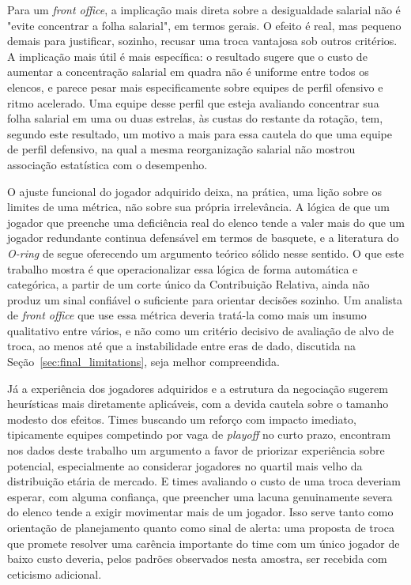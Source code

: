 Para um \textit{front office}, a implicação mais direta sobre a desigualdade salarial não é "evite concentrar a folha salarial", em termos gerais. O efeito é real, mas pequeno demais para justificar, sozinho, recusar uma troca vantajosa sob outros critérios. A implicação mais útil é mais específica: o resultado sugere que o custo de aumentar a concentração salarial em quadra não é uniforme entre todos os elencos, e parece pesar mais especificamente sobre equipes de perfil ofensivo e ritmo acelerado. Uma equipe desse perfil que esteja avaliando concentrar sua folha salarial em uma ou duas estrelas, às custas do restante da rotação, tem, segundo este resultado, um motivo a mais para essa cautela do que uma equipe de perfil defensivo, na qual a mesma reorganização salarial não mostrou associação estatística com o desempenho.

O ajuste funcional do jogador adquirido deixa, na prática, uma lição sobre os limites de uma métrica, não sobre sua própria irrelevância. A lógica de que um jogador que preenche uma deficiência real do elenco tende a valer mais do que um jogador redundante continua defensável em termos de basquete, e a literatura do \textit{O-ring} de \citet{kremer1993} segue oferecendo um argumento teórico sólido nesse sentido. O que este trabalho mostra é que operacionalizar essa lógica de forma automática e categórica, a partir de um corte único da Contribuição Relativa, ainda não produz um sinal confiável o suficiente para orientar decisões sozinho. Um analista de \textit{front office} que use essa métrica deveria tratá-la como mais um insumo qualitativo entre vários, e não como um critério decisivo de avaliação de alvo de troca, ao menos até que a instabilidade entre eras de dado, discutida na Seção~\ref{sec:final_limitations}, seja melhor compreendida.

Já a experiência dos jogadores adquiridos e a estrutura da negociação sugerem heurísticas mais diretamente aplicáveis, com a devida cautela sobre o tamanho modesto dos efeitos. Times buscando um reforço com impacto imediato, tipicamente equipes competindo por vaga de \textit{playoff} no curto prazo, encontram nos dados deste trabalho um argumento a favor de priorizar experiência sobre potencial, especialmente ao considerar jogadores no quartil mais velho da distribuição etária de mercado. E times avaliando o custo de uma troca deveriam esperar, com alguma confiança, que preencher uma lacuna genuinamente severa do elenco tende a exigir movimentar mais de um jogador. Isso serve tanto como orientação de planejamento quanto como sinal de alerta: uma proposta de troca que promete resolver uma carência importante do time com um único jogador de baixo custo deveria, pelos padrões observados nesta amostra, ser recebida com ceticismo adicional.

